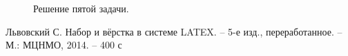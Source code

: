 \documentclass[12pt,a4paper,russian]{report}
\begin{document}
	\begin{figure}[h]
		\caption{Решение пятой задачи.}
		\label{img:fifth_task}
	\end{figure}
	


	\newpage
	\makeatletter
	\begin{thebibliography}{99}
		
		 Львовский С. Набор и вёрстка в системе LATEX. -- 5-е изд., переработанное. -- М.: МЦНМО, 2014. -- 400 с
		
		
	\end{thebibliography}
	
\end{document}
